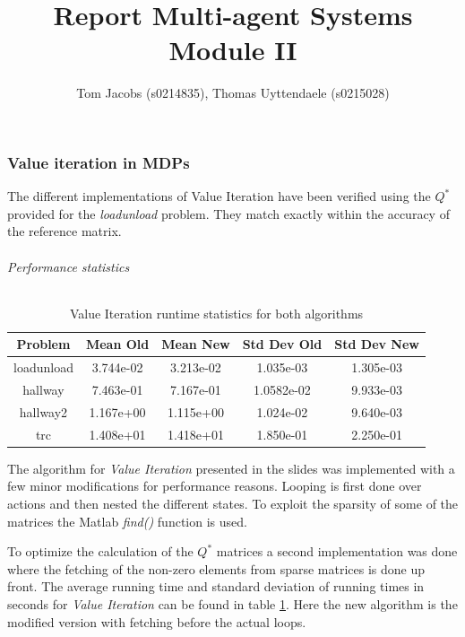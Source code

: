 \documentclass[10pt,a4paper]{article}
\title{Report Multi-agent Systems Module II}
\author{Tom Jacobs (s0214835), Thomas Uyttendaele (s0215028)}
\begin{document}
\maketitle
\part{}
\section{Value iteration in MDPs}
The different implementations of Value Iteration have been verified using the $Q^{*}$ provided for the \emph{loadunload} problem. They match exactly within the accuracy of the reference matrix.
\paragraph{Performance statistics}\hfill
\begin{table}[!h]


\centering
\begin{tabular}{ c | c | c | c | c}
Problem & Mean Old & Mean New & Std Dev Old & Std Dev New \\
\hline
loadunload & 3.744e-02 & 3.213e-02 & 1.035e-03 & 1.305e-03\\
hallway & 7.463e-01 & 7.167e-01 & 1.0582e-02 & 9.933e-03\\
hallway2 & 1.167e+00 & 1.115e+00 & 1.024e-02 & 9.640e-03 \\
trc & 1.408e+01 & 1.418e+01 & 1.850e-01 & 2.250e-01\\
\end{tabular}
\caption{Value Iteration runtime statistics for both algorithms}
\label{table:vi}
\end{table}

The algorithm for \emph{Value Iteration} presented in the slides was implemented with a few minor modifications for performance reasons. 
Looping is first done over actions and then nested the different states. To exploit the sparsity of some of the matrices the Matlab \emph{find()} function is used.

To optimize the calculation of the $Q^{*}$ matrices a second implementation was done where the fetching of the non-zero elements from sparse matrices is done up front. 
The average running time and standard deviation of running times in seconds for \emph{Value Iteration} can be found in table \ref{table:vi}. 
Here the new algorithm is the modified version with fetching before the actual loops.
\end{document}
